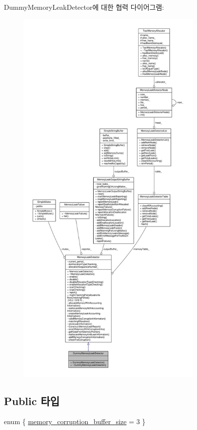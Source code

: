 Dummy\+Memory\+Leak\+Detector에 대한 협력 다이어그램\+:
\nopagebreak
\begin{figure}[H]
\begin{center}
\leavevmode
\includegraphics[height=550pt]{class_dummy_memory_leak_detector__coll__graph}
\end{center}
\end{figure}
\subsection*{Public 타입}
\begin{DoxyCompactItemize}
\item 
enum \{ \hyperlink{class_memory_leak_detector_a81929fb3d21206b62f55bcb744f71d5da5220cc4ba0bebf171c9984d05561bcc2}{memory\+\_\+corruption\+\_\+buffer\+\_\+size} = 3
 \}
\end{DoxyCompactItemize}

